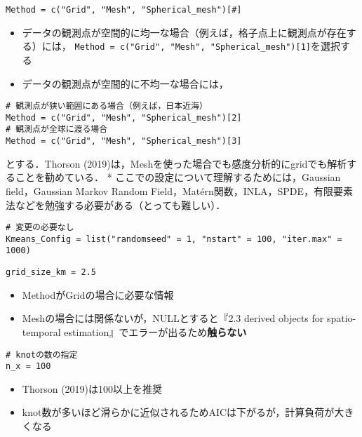 \documentclass[]{article}
\providecommand{\tightlist}{%
  \setlength{\itemsep}{0pt}\setlength{\parskip}{0pt}}
\begin{document}
\begin{verbatim}
Method = c("Grid", "Mesh", "Spherical_mesh")[#]
\end{verbatim}

\begin{itemize}
\tightlist
\item
  データの観測点が空間的に均一な場合（例えば，格子点上に観測点が存在する）には，
  \texttt{Method\ =\ c("Grid",\ "Mesh",\ "Spherical\_mesh"){[}1{]}}を選択する
\item
  データの観測点が空間的に不均一な場合には，
\end{itemize}

\begin{verbatim}
# 観測点が狭い範囲にある場合（例えば，日本近海）
Method = c("Grid", "Mesh", "Spherical_mesh")[2]
# 観測点が全球に渡る場合
Method = c("Grid", "Mesh", "Spherical_mesh")[3]
\end{verbatim}

とする．Thorson
(2019)は，Meshを使った場合でも感度分析的にgridでも解析することを勧めている．
* ここでの設定について理解するためには，Gaussian field，Gaussian Markov
Random
Field，Matérn関数，INLA，SPDE，有限要素法などを勉強する必要がある（とっても難しい）．

\begin{verbatim}
# 変更の必要なし
Kmeans_Config = list("randomseed" = 1, "nstart" = 100, "iter.max" = 1000)
\end{verbatim}

\begin{verbatim}
grid_size_km = 2.5
\end{verbatim}

\begin{itemize}
\tightlist
\item
  MethodがGridの場合に必要な情報
\item
  Meshの場合には関係ないが，NULLとすると『2.3 derived objects for
  spatio-temporal estimation』でエラーが出るため\textbf{触らない}
\end{itemize}

\begin{verbatim}
# knotの数の指定
n_x = 100
\end{verbatim}

\begin{itemize}
\tightlist
\item
  Thorson (2019)は100以上を推奨
\item
  knot数が多いほど滑らかに近似されるためAICは下がるが，計算負荷が大きくなる
\end{itemize}
\end{document}
